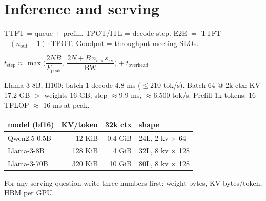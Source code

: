\section{Inference and serving}\label{sec:inf}

\begin{center}
\end{center}

\begin{mem}
TTFT = queue + prefill. TPOT/ITL = decode step. E2E $=$ TTFT $+(n_\text{out}-1)\cdot$TPOT. Goodput = throughput meeting SLOs.\\[2pt]
{\centering $t_\text{step}\approx\max\Big(\dfrac{2NB}{F_\text{peak}},\ \dfrac{2N+B\,n_\text{ctx}\,s_\text{kv}}{\text{BW}}\Big)+t_\text{overhead}$\par}
Llama-3-8B, H100: batch-1 decode 4.8 ms ($\le$210 tok/s). Batch 64 @ 2k ctx: KV 17.2 GB $>$ weights 16 GB; step $\approx$9.9 ms, $\approx$6{,}500 tok/s. Prefill 1k tokens: 16 TFLOP $\approx$ 16 ms at peak.\\[2pt]
\begin{tabularx}{\linewidth}{@{}lrrL@{}}
\toprule
model (bf16) & KV/token & 32k ctx & shape\\\midrule
Qwen2.5-0.5B & 12 KiB & 0.4 GiB & 24L, 2 kv $\times$ 64\\
Llama-3-8B & 128 KiB & 4 GiB & 32L, 8 kv $\times$ 128\\
Llama-3-70B & 320 KiB & 10 GiB & 80L, 8 kv $\times$ 128\\\bottomrule
\end{tabularx}
For any serving question write three numbers first: weight bytes, KV bytes/token, HBM per GPU.
\end{mem}

